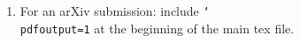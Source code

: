 \begin{enumerate}
  \item For an arXiv submission: include \texttt{\char`\\pdfoutput=1} at the beginning of the main tex file.
\end{enumerate}

